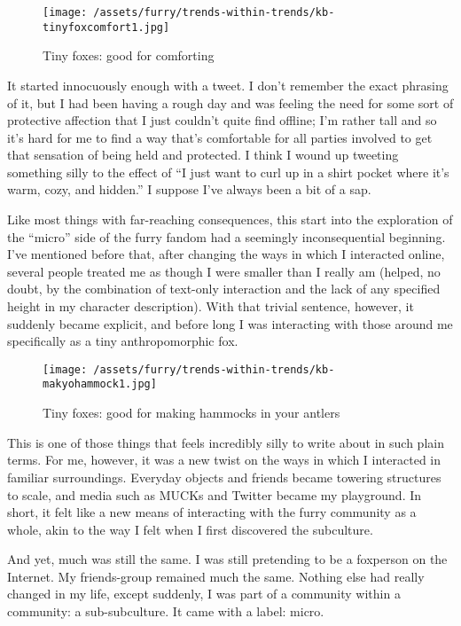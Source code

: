 \begin{figure}[htbp]
\centering
\texttt{[image: /assets/furry/trends-within-trends/kb-tinyfoxcomfort1.jpg]}
\caption{Tiny foxes: good for comforting}
\end{figure}

It started innocuously enough with a tweet. I don't remember the exact
phrasing of it, but I had been having a rough day and was feeling the
need for some sort of protective affection that I just couldn't quite
find offline; I'm rather tall and so it's hard for me to find a way
that's comfortable for all parties involved to get that sensation of
being held and protected. I think I wound up tweeting something silly to
the effect of ``I just want to curl up in a shirt pocket where it's
warm, cozy, and hidden.'' I suppose I've always been a bit of a sap.

Like most things with far-reaching consequences, this start into the
exploration of the ``micro'' side of the furry fandom had a seemingly
inconsequential beginning. I've mentioned before that, after changing
the ways in which I interacted online, several people treated me as
though I were smaller than I really am (helped, no doubt, by the
combination of text-only interaction and the lack of any specified
height in my character description). With that trivial sentence,
however, it suddenly became explicit, and before long I was interacting
with those around me specifically as a tiny anthropomorphic fox.

\begin{figure}[htbp]
\centering
\texttt{[image: /assets/furry/trends-within-trends/kb-makyohammock1.jpg]}
\caption{Tiny foxes: good for making hammocks in your antlers}
\end{figure}

This is one of those things that feels incredibly silly to write about
in such plain terms. For me, however, it was a new twist on the ways in
which I interacted in familiar surroundings. Everyday objects and
friends became towering structures to scale, and media such as MUCKs and
Twitter became my playground. In short, it felt like a new means of
interacting with the furry community as a whole, akin to the way I felt
when I first discovered the subculture.

And yet, much was still the same. I was still pretending to be a
foxperson on the Internet. My friends-group remained much the same.
Nothing else had really changed in my life, except suddenly, I was part
of a community within a community: a sub-subculture. It came with a
label: micro.

